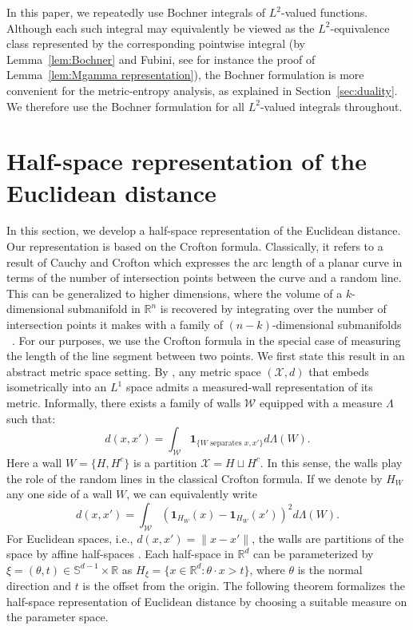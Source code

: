 \documentclass[11pt]{amsart}
\theoremstyle{definition}
\theoremstyle{remark}
\newcommand{\R}{\mathbb{R}}
\newcommand{\1}{\mathbf{1}}
\newcommand{\Sd}{\mathbb{S}}
\numberwithin{equation}{section}
\begin{document}
In this paper, we repeatedly use Bochner integrals of $L^2$-valued
functions. Although each such integral may equivalently be viewed as the
$L^2$-equivalence class represented by the corresponding pointwise
integral (by Lemma~\ref{lem:Bochner} and Fubini, see for instance the
proof of Lemma~\ref{lem:Mgamma representation}), the Bochner formulation
is more convenient for the metric-entropy analysis, as explained in
Section~\ref{sec:duality}. We therefore use the Bochner formulation for all
$L^2$-valued integrals throughout.

\section{Half-space representation of the Euclidean distance}
\label{sec:crofton-halfspace}
In this section, we develop a half-space representation of the Euclidean distance. Our representation is based on the Crofton formula. Classically, it refers to a result of Cauchy and Crofton which expresses the arc length of a planar curve in terms of the number of intersection points between the curve and a random line. This can be generalized to higher dimensions, where the volume of a $k$-dimensional submanifold in $\R^n$ is recovered by integrating over the number of intersection points it makes with a family of $(n-k)$-dimensional submanifolds ~\cite{Brothers1966,Chern1952,Federer1954,Howard1993}. For our purposes, we use the Crofton formula in the special case of measuring the length of the line segment between two points. We first state this result in an abstract metric space setting. By \cite[Remark 2.9, Corollary 5.4]{ChatterjiDrutuHaglund2010}, any metric space $(\mathcal{X},d)$ that embeds isometrically into an $L^1$ space admits a measured-wall representation of its metric. Informally, there exists a family of walls $\mathcal W$ equipped with a measure $\Lambda$ such that:
\[
    d(x,x')=\int_{\mathcal W}\mathbf{1}_{\{W\text{ separates }x,x'\}}d\Lambda(W).
\]
Here a wall $W = \{H,H^c\}$ is a partition $\mathcal{X}=H\sqcup H^c$. In this sense, the walls play the role of the random lines in the classical Crofton formula. If we denote by $H_W$ any one side of a wall $W$, we can equivalently write
\begin{equation}\label{eq:general-crofton}
d(x,x')=\int_{\mathcal W}(\mathbf{1}_{H_W}(x) - \mathbf{1}_{H_W}(x'))^2 d\Lambda(W).
\end{equation}
For Euclidean spaces, i.e., $d(x,x') = \|x - x'\|$, the walls are partitions of the space by affine half-spaces \cite{Santalo2004}. Each half-space in $\R^d$ can be parameterized by $\xi = (\theta, t) \in \Sd^{d-1}\times \R$ as $H_\xi = \{x\in \R^d: \theta\cdot x > t\}$, where $\theta$ is the normal direction and $t$ is the offset from the origin. The following theorem formalizes the half-space representation of Euclidean distance by choosing a suitable measure on the parameter space.
\end{document}
